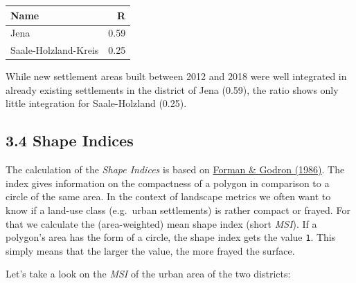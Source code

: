 \documentclass[]{article}
\newenvironment{Shaded}{\begin{snugshade}}{\end{snugshade}}
\newcommand{\KeywordTok}[1]{\textcolor[rgb]{0.13,0.29,0.53}{\textbf{#1}}}
\newcommand{\DataTypeTok}[1]{\textcolor[rgb]{0.13,0.29,0.53}{#1}}
\newcommand{\DecValTok}[1]{\textcolor[rgb]{0.00,0.00,0.81}{#1}}
\newcommand{\StringTok}[1]{\textcolor[rgb]{0.31,0.60,0.02}{#1}}
\newcommand{\CommentTok}[1]{\textcolor[rgb]{0.56,0.35,0.01}{\textit{#1}}}
\newcommand{\OperatorTok}[1]{\textcolor[rgb]{0.81,0.36,0.00}{\textbf{#1}}}
\newcommand{\NormalTok}[1]{#1}
\begin{document}
\begin{longtable}[]{@{}lr@{}}
\toprule
Name & R\tabularnewline
\midrule
\endhead
Jena & 0.59\tabularnewline
Saale-Holzland-Kreis & 0.25\tabularnewline
\bottomrule
\end{longtable}

While new settlement areas built between 2012 and 2018 were well
integrated in already existing settlements in the district of Jena
(0.59), the ratio shows only little integration for Saale-Holzland
(0.25).

\subsection{3.4 Shape Indices}\label{shape-indices}

The calculation of the \emph{Shape Indices} is based on
\href{https://link.springer.com/journal/10980}{Forman \& Godron (1986)}.
The index gives information on the compactness of a polygon in
comparison to a circle of the same area. In the context of landscape
metrics we often want to know if a land-use class (e.g.~urban
settlements) is rather compact or frayed. For that we calculate the
(area-weighted) mean shape index (short \emph{MSI}). If a polygon's area
has the form of a circle, the shape index gets the value \texttt{1}.
This simply means that the larger the value, the more frayed the
surface.

Let's take a look on the \emph{MSI} of the urban area of the two
districts:

\begin{Shaded}
\end{Shaded}
\end{document}

